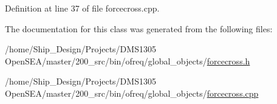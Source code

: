 Definition at line 37 of file forcecross.\-cpp.



The documentation for this class was generated from the following files\-:\begin{DoxyCompactItemize}
\item 
/home/\-Ship\-\_\-\-Design/\-Projects/\-D\-M\-S1305 Open\-S\-E\-A/master/200\-\_\-src/bin/ofreq/global\-\_\-objects/\hyperlink{forcecross_8h}{forcecross.\-h}\item 
/home/\-Ship\-\_\-\-Design/\-Projects/\-D\-M\-S1305 Open\-S\-E\-A/master/200\-\_\-src/bin/ofreq/global\-\_\-objects/\hyperlink{forcecross_8cpp}{forcecross.\-cpp}\end{DoxyCompactItemize}
